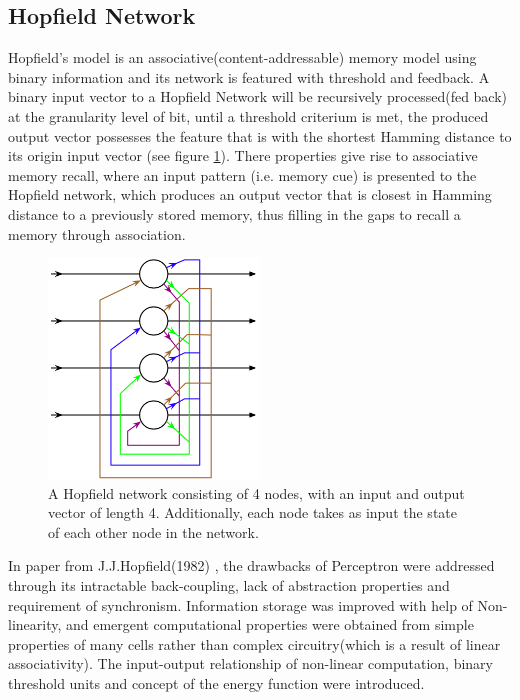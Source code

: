 \subsection{Hopfield Network}

Hopfield's model is an associative(content-addressable) memory model using binary information and its network is featured with threshold and feedback. A binary input vector to a Hopfield Network will be recursively processed(fed back) at the granularity level of bit, until a threshold criterium is met, the produced output vector possesses the feature that is with the shortest Hamming distance to its origin input vector (see figure \ref{fig:hopfield_network}). There properties give rise to associative memory recall, where an input pattern (i.e. memory cue) is presented to the Hopfield network, which produces an output vector that is closest in Hamming distance to a previously stored memory, thus filling in the gaps to recall a memory through association.

\begin{figure}[htbp]
	\begin{center}
		\includegraphics[width=0.5\textwidth]{inc/hopfield_network.png}
		\caption{A Hopfield network consisting of 4 nodes, with an input and output vector of length 4. Additionally, each node takes as input the state of each other node in the network.\protect\footnotemark}
		\label{fig:hopfield_network}
	\end{center}
\end{figure}

In paper from J.J.Hopfield(1982) \cite{computational_abilities}, the drawbacks of Perceptron were addressed through its intractable back-coupling, lack of abstraction properties and requirement of synchronism. Information storage was improved with help of Non-linearity, and emergent computational properties were obtained from simple properties of many cells rather than complex circuitry(which is a result of linear associativity). The input-output relationship of non-linear computation, binary threshold units and concept of the energy function were introduced.

